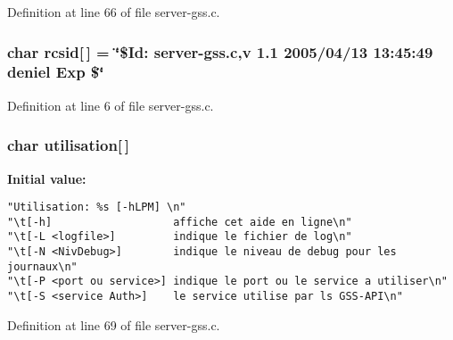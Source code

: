 Definition at line 66 of file server-gss.c.
\subsubsection{\setlength{\rightskip}{0pt plus 5cm}char {\bf rcsid}[$\,$] = \char`\"{}\$Id: {\bf server}-gss.c,v 1.1 2005/04/13 13:45:49 deniel Exp \$\char`\"{}}\label{server-gss_8c_a23}




Definition at line 6 of file server-gss.c.
\subsubsection{\setlength{\rightskip}{0pt plus 5cm}char {\bf utilisation}[$\,$]}\label{server-gss_8c_a25}


{\bf Initial value:}

\footnotesize\begin{verbatim} 
"Utilisation: %s [-hLPM] \n"
"\t[-h]                   affiche cet aide en ligne\n"
"\t[-L <logfile>]         indique le fichier de log\n"
"\t[-N <NivDebug>]        indique le niveau de debug pour les journaux\n" 
"\t[-P <port ou service>] indique le port ou le service a utiliser\n"
"\t[-S <service Auth>]    le service utilise par ls GSS-API\n"
\end{verbatim}\normalsize 


Definition at line 69 of file server-gss.c.
